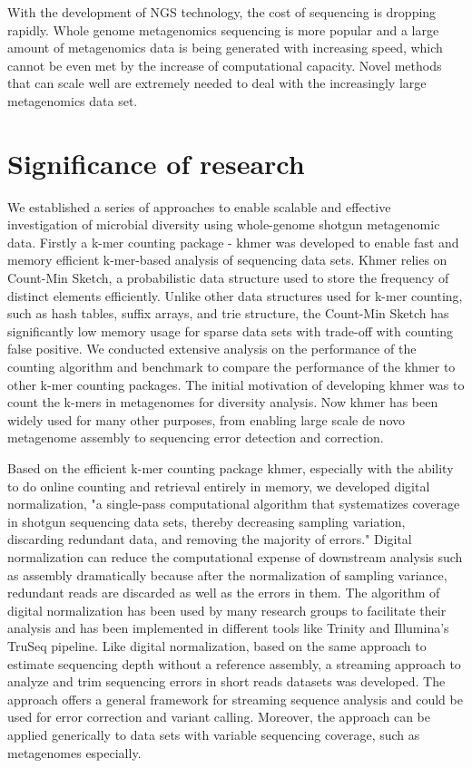 With the development of NGS technology, the cost of sequencing is dropping
rapidly. Whole genome metagenomics sequencing is more popular and a large amount
of metagenomics data is being generated with increasing speed, which cannot be
even met by the increase of computational capacity. Novel methods that can
scale well are extremely needed to deal with the increasingly large
metagenomics data set.


\section{Significance of research}


We established a series of approaches to enable scalable and effective
investigation of microbial diversity using whole-genome shotgun metagenomic
data. Firstly a k-mer counting package - khmer was developed to enable fast and
memory efficient k-mer-based analysis of sequencing data sets\cite{Zhang2014,khmer}. Khmer relies on 
Count-Min Sketch, a probabilistic data structure used to store the frequency of 
distinct elements efficiently. Unlike other data structures used for k-mer 
counting, such as hash tables, suffix arrays, and trie structure, the Count-Min
Sketch has significantly low memory usage for sparse data sets with trade-off 
with counting false positive. We conducted extensive analysis on the
performance of the counting algorithm and benchmark to compare the performance
of the khmer to other k-mer counting packages. The initial motivation of
developing khmer was to count the k-mers in metagenomes for diversity
analysis. Now khmer has been widely used for many other purposes, from enabling
large scale de novo metagenome assembly to sequencing error detection and
correction.

Based on the efficient k-mer counting package khmer, especially with the ability
to do online counting and retrieval entirely in memory, we developed digital
normalization\cite{Brown2012}, "a single-pass computational algorithm that systematizes
coverage in shotgun sequencing data sets, thereby decreasing sampling 
variation, discarding redundant data, and removing the majority of errors." 
Digital normalization can reduce the computational expense of downstream analysis
such as assembly dramatically because after the normalization of sampling variance,
redundant reads are discarded as well as the errors in 
them. The algorithm of digital
normalization has been used by many research groups to facilitate their
analysis and has been implemented in different tools like Trinity and 
Illumina's TruSeq pipeline. Like digital normalization, based on the same
approach to estimate sequencing depth without a reference assembly, a streaming
approach to analyze and trim sequencing errors in short reads datasets was
developed\cite{zhang2015crossing}. The approach offers a general framework for streaming sequence
analysis and could be used for error correction and variant calling. Moreover,
the approach can be applied generically to data sets with variable sequencing
coverage, such as metagenomes especially.

